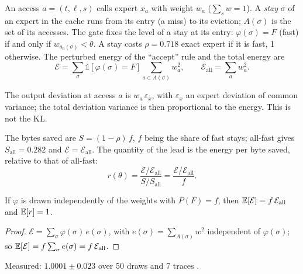 An access $a = (t, \ell, s)$ calls expert $x_a$ with weight $w_a$ ($\sum_s w = 1$). A \emph{stay} $\sigma$ of an expert in the cache runs from its entry (a miss) to its eviction; $A(\sigma)$ is the set of its accesses. The gate fixes the level of a stay at its entry: $\varphi(\sigma) = F$ (fast) if and only if $w_{a_0(\sigma)} < \theta$. A stay costs $\rho = 0.718$ exact expert if it is fast, 1 otherwise. The perturbed energy of the ``accept'' rule and the total energy are
\begin{equation}\label{t3mim:eq:p6-energie}
\mathcal E = \sum_\sigma \mathbb{1}[\varphi(\sigma) = F] \sum_{a \in A(\sigma)} w_a^2, \qquad \mathcal E_{\text{all}} = \sum_a w_a^2 .
\end{equation}
\begin{hypothese}\label{t3mim:hyp:energie}
The output deviation at access $a$ is $w_a\,\varepsilon_x$, with $\varepsilon_x$ an expert deviation of common variance; the total deviation variance is then proportional to the energy. This is not the KL.
\end{hypothese}
The bytes saved are $S = (1 - \rho)\,f$, $f$ being the share of fast stays; all-fast gives $S_{\text{all}} = 0.282$ and $\mathcal E = \mathcal E_{\text{all}}$. The quantity of the lead is the energy per byte saved, relative to that of all-fast:
\begin{equation}\label{t3mim:eq:p6-r}
r(\theta) = \frac{\mathcal E/\mathcal E_{\text{all}}}{S / S_{\text{all}}} = \frac{\mathcal E/\mathcal E_{\text{all}}}{f} .
\end{equation}

\begin{proposition}\label{t3mim:prop:p6-hasard}
If $\varphi$ is drawn independently of the weights with $P(F) = f$, then $\mathbb{E}[\mathcal E] = f\,\mathcal E_{\text{all}}$ and $\mathbb{E}[r] = 1$.
\end{proposition}
\begin{proof}
$\mathcal E = \sum_\sigma \varphi(\sigma)\,e(\sigma)$, with $e(\sigma) = \sum_{A(\sigma)} w^2$ independent of $\varphi(\sigma)$; so $\mathbb{E}[\mathcal E] = f \sum_\sigma e(\sigma) = f\,\mathcal E_{\text{all}}$.
\end{proof}
Measured: $1.0001 \pm 0.023$ over 50 draws and 7 traces \mes.

